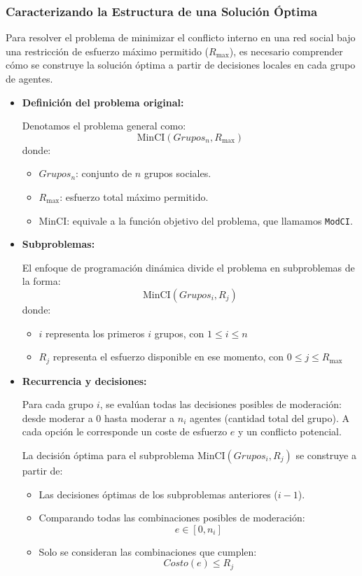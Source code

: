 \documentclass[11pt,letter]{article}
\begin{document}
\subsubsection{Caracterizando la Estructura de una Solución Óptima}

Para resolver el problema de minimizar el conflicto interno en una red social bajo una restricción de esfuerzo máximo permitido ($R_{\text{max}}$), es necesario comprender cómo se construye la solución óptima a partir de decisiones locales en cada grupo de agentes.

\begin{itemize}
    \item \textbf{Definición del problema original:}
    
    Denotamos el problema general como:
    \[
        \text{MinCI}(Grupos_n, R_{\text{max}})
    \]
    donde:
    \begin{itemize}
        \item $Grupos_n$: conjunto de $n$ grupos sociales.
        \item $R_{\text{max}}$: esfuerzo total máximo permitido.
        \item $\text{MinCI}$: equivale a la función objetivo del problema, que llamamos \texttt{ModCI}.
    \end{itemize}
    
    \item \textbf{Subproblemas:}
    
    El enfoque de programación dinámica divide el problema en subproblemas de la forma:
    \[
        \text{MinCI}(Grupos_i, R_j)
    \]
    donde:
    \begin{itemize}
        \item $i$ representa los primeros $i$ grupos, con $1 \leq i \leq n$
        \item $R_j$ representa el esfuerzo disponible en ese momento, con $0 \leq j \leq R_{\text{max}}$
    \end{itemize}
    
    \item \textbf{Recurrencia y decisiones:}
    
    Para cada grupo $i$, se evalúan todas las decisiones posibles de moderación: desde moderar a $0$ hasta moderar a $n_i$ agentes (cantidad total del grupo). A cada opción le corresponde un coste de esfuerzo $e$ y un conflicto potencial.
    
    La decisión óptima para el subproblema $\text{MinCI}(Grupos_i, R_j)$ se construye a partir de:
    \begin{itemize}
        \item Las decisiones óptimas de los subproblemas anteriores ($i - 1$).
        \item Comparando todas las combinaciones posibles de moderación:
        \[
            e \in [0, n_i]
        \]
        \item Solo se consideran las combinaciones que cumplen:
        \[
            Costo(e) \leq R_j
        \]
    \end{itemize}
    

\end{itemize}
\end{document}
